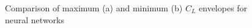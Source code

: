 \documentclass[11pt]{ucthesis}
\begin{document}
\begin{figure}[thpb]
\centering
{} 
\caption{Comparison of maximum (a) and minimum (b) $C_L$ envelopes for neural networks}
\label{fig:NNCLMax}
\end{figure}
\end{document}
